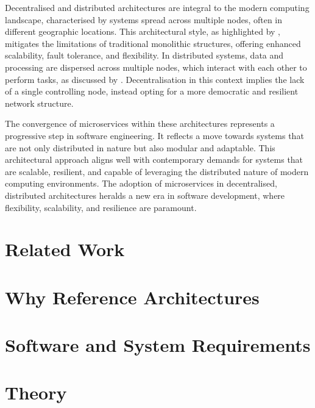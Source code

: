 \documentclass[preprint,12pt]{elsarticle}
\begin{document}
Decentralised and distributed architectures are integral to the modern computing landscape, characterised by systems spread across multiple nodes, often in different geographic locations. This architectural style, as highlighted by \citet{Richards2015}, mitigates the limitations of traditional monolithic structures, offering enhanced scalability, fault tolerance, and flexibility. In distributed systems, data and processing are dispersed across multiple nodes, which interact with each other to perform tasks, as discussed by \citet{Coulouris2005}. Decentralisation in this context implies the lack of a single controlling node, instead opting for a more democratic and resilient network structure.

The convergence of microservices within these architectures represents a progressive step in software engineering. It reflects a move towards systems that are not only distributed in nature but also modular and adaptable. This architectural approach aligns well with contemporary demands for systems that are scalable, resilient, and capable of leveraging the distributed nature of modern computing environments. The adoption of microservices in decentralised, distributed architectures heralds a new era in software development, where flexibility, scalability, and resilience are paramount.




\section{Related Work}
\label{sec:related_work}

\section{Why Reference Architectures}
\label{sec:why_reference_architectures}

\section{Software and System Requirements}
\label{sec:software_and_system_requirements}

\section{Theory}
\label{sec:theory}
\end{document}
